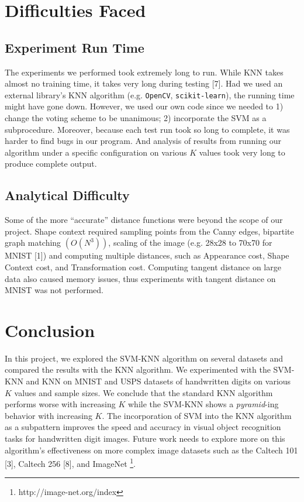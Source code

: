 \documentclass[11pt,letterpaper]{article}
\begin{document}
\section{Difficulties Faced}

\subsection{Experiment Run Time}

The experiments we performed took extremely long to run. While KNN takes almost no training time, it takes very long during testing [7]. Had we used an external library's KNN algorithm (e.g. {\tt OpenCV}, {\tt scikit-learn}), the running time might have gone down. However, we used our own code since we needed to 1) change the voting scheme to be unanimous; 2) incorporate the SVM as a subprocedure. Moreover, because each test run took so long to complete, it was harder to find bugs in our program. And analysis of results from running our algorithm under a specific configuration on various $K$ values took very long to produce complete output.

\subsection{Analytical Difficulty}

Some of the more ``accurate'' distance functions were beyond the scope of our project. Shape context required sampling points from the Canny edges, bipartite graph matching $(O(N^3))$, scaling of the image (e.g. 28x28 to 70x70 for MNIST [1]) and computing multiple distances, such as Appearance cost, Shape Context cost, and Transformation cost. Computing tangent distance on large data also caused memory issues, thus experiments with tangent distance on MNIST was not performed.


\section{Conclusion}

In this project, we explored the SVM-KNN algorithm on several datasets and compared the results with the KNN algorithm. We experimented with the SVM-KNN and KNN on MNIST and USPS datasets of handwritten digits on various $K$ values and sample sizes. We conclude that the standard KNN algorithm performs worse with increasing $K$ while the SVM-KNN shows a \textit{pyramid}-ing behavior with increasing $K$. The incorporation of SVM into the KNN algorithm as a subpattern improves the speed and accuracy in visual object recognition tasks for handwritten digit images. Future work needs to explore more on this algorithm's effectiveness on more complex image datasets such as the Caltech 101 [3], Caltech 256 [8], and ImageNet \footnote{http://image-net.org/index}.
\end{document}
